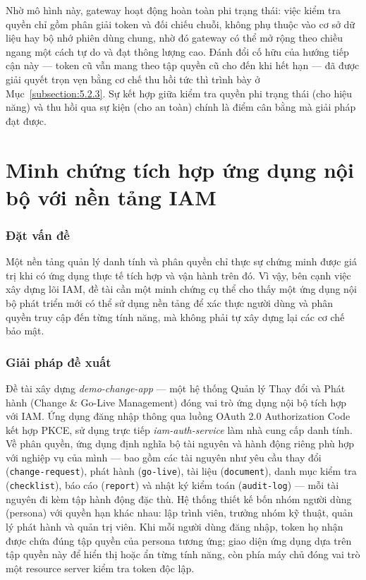 \documentclass[../DoAn.tex]{subfiles}
\begin{document}
Nhờ mô hình này, gateway hoạt động hoàn toàn phi trạng thái: việc kiểm tra quyền chỉ gồm phân giải token và đối chiếu chuỗi, không phụ thuộc vào cơ sở dữ liệu hay bộ nhớ phiên dùng chung, nhờ đó gateway có thể mở rộng theo chiều ngang một cách tự do và đạt thông lượng cao. Đánh đổi cố hữu của hướng tiếp cận này --- token cũ vẫn mang theo tập quyền cũ cho đến khi hết hạn --- đã được giải quyết trọn vẹn bằng cơ chế thu hồi tức thì trình bày ở Mục~\ref{subsection:5.2.3}. Sự kết hợp giữa kiểm tra quyền phi trạng thái (cho hiệu năng) và thu hồi qua sự kiện (cho an toàn) chính là điểm cân bằng mà giải pháp đạt được.

\section{Minh chứng tích hợp ứng dụng nội bộ với nền tảng IAM}
\label{section:5.4}

\subsubsection*{Đặt vấn đề}

Một nền tảng quản lý danh tính và phân quyền chỉ thực sự chứng minh được giá trị khi có ứng dụng thực tế tích hợp và vận hành trên đó. Vì vậy, bên cạnh việc xây dựng lõi IAM, đề tài cần một minh chứng cụ thể cho thấy một ứng dụng nội bộ phát triển mới có thể sử dụng nền tảng để xác thực người dùng và phân quyền truy cập đến từng tính năng, mà không phải tự xây dựng lại các cơ chế bảo mật.

\subsubsection*{Giải pháp đề xuất}

Đề tài xây dựng \textit{demo-change-app} --- một hệ thống Quản lý Thay đổi và Phát hành (Change \& Go-Live Management) đóng vai trò ứng dụng nội bộ tích hợp với IAM. Ứng dụng đăng nhập thông qua luồng OAuth 2.0 Authorization Code kết hợp PKCE, sử dụng trực tiếp \textit{iam-auth-service} làm nhà cung cấp danh tính. Về phân quyền, ứng dụng định nghĩa bộ tài nguyên và hành động riêng phù hợp với nghiệp vụ của mình --- bao gồm các tài nguyên như yêu cầu thay đổi (\texttt{change-request}), phát hành (\texttt{go-live}), tài liệu (\texttt{document}), danh mục kiểm tra (\texttt{checklist}), báo cáo (\texttt{report}) và nhật ký kiểm toán (\texttt{audit-log}) --- mỗi tài nguyên đi kèm tập hành động đặc thù. Hệ thống thiết kế bốn nhóm người dùng (persona) với quyền hạn khác nhau: lập trình viên, trưởng nhóm kỹ thuật, quản lý phát hành và quản trị viên. Khi mỗi người dùng đăng nhập, token họ nhận được chứa đúng tập quyền của persona tương ứng; giao diện ứng dụng dựa trên tập quyền này để hiển thị hoặc ẩn từng tính năng, còn phía máy chủ đóng vai trò một resource server kiểm tra token độc lập.
\end{document}

